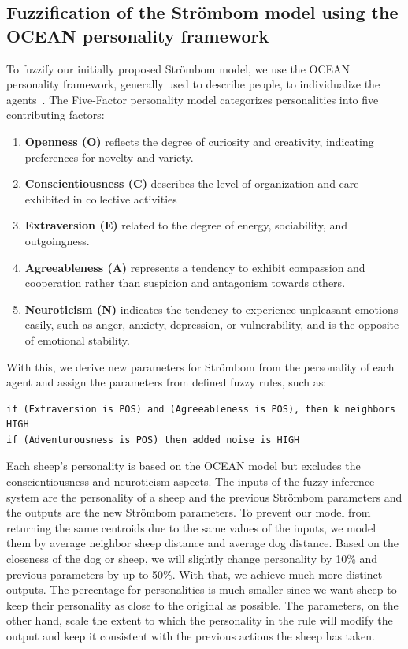 \documentclass[9pt]{pnas-new}
\begin{document}
\subsection{Fuzzification of the Str\"{o}mbom model using the OCEAN personality framework}
To fuzzify our initially proposed Str\"{o}mbom model, we use the OCEAN personality framework, generally used to describe people, to individualize the agents~\cite{fuzzylogic}. The Five-Factor personality model categorizes personalities into five contributing factors:
\begin{enumerate}
  \item \textbf{Openness (O)} reflects the degree of curiosity and creativity, indicating preferences for novelty and variety.
  \item \textbf{Conscientiousness (C)} describes the level of organization and care exhibited in collective activities
  \item \textbf{Extraversion (E)} related to the degree of energy, sociability, and outgoingness.
  \item \textbf{Agreeableness (A)} represents a tendency to exhibit compassion and cooperation rather than suspicion and antagonism towards others.
  \item \textbf{Neuroticism (N)} indicates the tendency to experience unpleasant emotions easily, such as anger, anxiety, depression, or vulnerability, and is the opposite of emotional stability.
\end{enumerate}

With this, we derive new parameters for Str\"{o}mbom from the personality of each agent and assign the parameters from defined fuzzy rules, such as:
\begin{verbatim}    
if (Extraversion is POS) and (Agreeableness is POS), then k neighbors HIGH
if (Adventurousness is POS) then added noise is HIGH
\end{verbatim}
Each sheep's personality is based on the OCEAN model but excludes the conscientiousness and neuroticism aspects. The inputs of the fuzzy inference system are the personality of a sheep and the previous Str\"{o}mbom parameters and the outputs are the new Str\"{o}mbom parameters. To prevent our model from returning the same centroids due to the same values of the inputs, we model them by average neighbor sheep distance and average dog distance. Based on the closeness of the dog or sheep, we will slightly change personality by 10\% and previous parameters by up to 50\%. With that, we achieve much more distinct outputs. The percentage for personalities is much smaller since we want sheep to keep their personality as close to the original as possible. The parameters, on the other hand, scale the extent to which the personality in the rule will modify the output and keep it consistent with the previous actions the sheep has taken.
\end{document}
